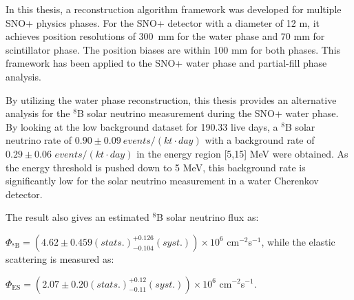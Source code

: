 In this thesis, a reconstruction algorithm framework was developed for multiple SNO+ physics phases. For the SNO+ detector with a diameter of 12 m, it achieves position resolutions of 300~mm for the water phase and 70 mm for scintillator phase. The position biases are within 100 mm for both phases. This framework has been applied to the SNO+ water phase and partial-fill phase analysis. 

By utilizing the water phase reconstruction, this thesis provides an alternative analysis for the $^8$B solar neutrino measurement during the SNO+ water phase. By looking at the low background dataset for 190.33 live days, a $^8$B solar neutrino rate of $0.90\pm0.09~events/(kt\cdot day)$ with a background rate of $0.29\pm 0.06$ $events/(kt\cdot day)$ in the energy region [5,15] MeV were obtained. As the energy threshold is pushed down to 5 MeV, this background rate is significantly low for the solar neutrino measurement in a water Cherenkov detector.

The result also gives an estimated $^8$B solar neutrino flux as: 

$\Phi_{\mathrm{^8B}}=(4.62 \pm 0.459 (stats.)^{+0.126}_{-0.104}(syst.))\times10^6$ cm$^{-2}$s$^{-1}$, 
while the elastic scattering is measured as: 

$\Phi_{\mathrm{ES}}=(2.07 \pm 0.20(stats.)^{+0.12}_{-0.11}(syst.))\times10^6$ cm$^{-2}$s$^{-1}$.
